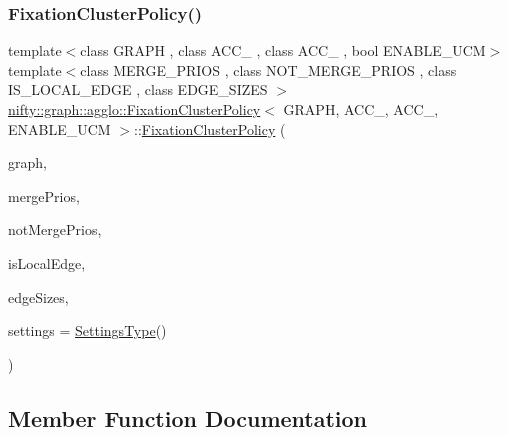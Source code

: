 \subsubsection{\texorpdfstring{Fixation\+Cluster\+Policy()}{FixationClusterPolicy()}}
{\footnotesize\ttfamily template$<$class G\+R\+A\+PH , class A\+C\+C\+\_ , class A\+C\+C\+\_ , bool E\+N\+A\+B\+L\+E\+\_\+\+U\+CM$>$ \\
template$<$class M\+E\+R\+G\+E\+\_\+\+P\+R\+I\+OS , class N\+O\+T\+\_\+\+M\+E\+R\+G\+E\+\_\+\+P\+R\+I\+OS , class I\+S\+\_\+\+L\+O\+C\+A\+L\+\_\+\+E\+D\+GE , class E\+D\+G\+E\+\_\+\+S\+I\+Z\+ES $>$ \\
\hyperlink{classnifty_1_1graph_1_1agglo_1_1FixationClusterPolicy}{nifty\+::graph\+::agglo\+::\+Fixation\+Cluster\+Policy}$<$ G\+R\+A\+PH, A\+C\+C\+\_, A\+C\+C\+\_, E\+N\+A\+B\+L\+E\+\_\+\+U\+CM $>$\+::\hyperlink{classnifty_1_1graph_1_1agglo_1_1FixationClusterPolicy}{Fixation\+Cluster\+Policy} (\begin{DoxyParamCaption}\item[{const \hyperlink{classnifty_1_1graph_1_1agglo_1_1FixationClusterPolicy_a1b20f47fae0c5f5a247ca049bb60400b}{Graph\+Type} \&}]{graph,  }\item[{const M\+E\+R\+G\+E\+\_\+\+P\+R\+I\+OS \&}]{merge\+Prios,  }\item[{const N\+O\+T\+\_\+\+M\+E\+R\+G\+E\+\_\+\+P\+R\+I\+OS \&}]{not\+Merge\+Prios,  }\item[{const I\+S\+\_\+\+L\+O\+C\+A\+L\+\_\+\+E\+D\+GE \&}]{is\+Local\+Edge,  }\item[{const E\+D\+G\+E\+\_\+\+S\+I\+Z\+ES \&}]{edge\+Sizes,  }\item[{const \hyperlink{structnifty_1_1graph_1_1agglo_1_1FixationClusterPolicy_1_1SettingsType}{Settings\+Type} \&}]{settings = {\ttfamily \hyperlink{structnifty_1_1graph_1_1agglo_1_1FixationClusterPolicy_1_1SettingsType}{Settings\+Type}()} }\end{DoxyParamCaption})\hspace{0.3cm}{\ttfamily [inline]}}



\subsection{Member Function Documentation}
\mbox{\label{classnifty_1_1graph_1_1agglo_1_1FixationClusterPolicy_ab46ef0cd4affa4be6be2ba58409ad4c3}} 
